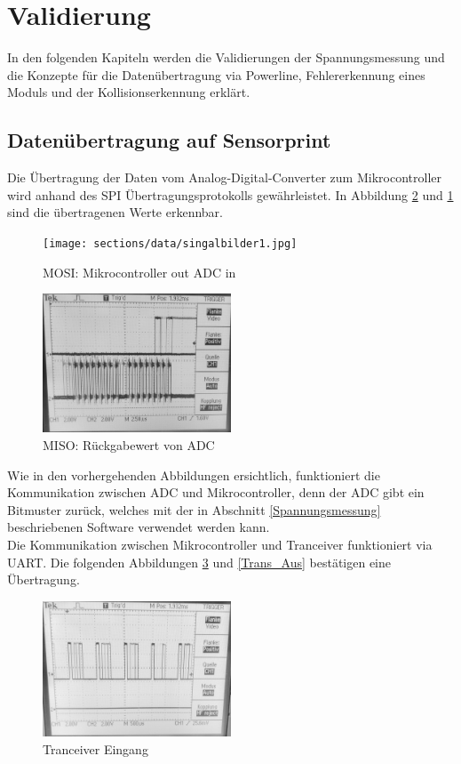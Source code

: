 \section{Validierung}
In den folgenden Kapiteln werden die Validierungen der Spannungsmessung und die Konzepte für die Datenübertragung via Powerline, Fehlererkennung eines Moduls und der Kollisionserkennung erklärt.
\subsection{Datenübertragung auf Sensorprint}
Die Übertragung der Daten vom Analog-Digital-Converter zum Mikrocontroller wird anhand des SPI Übertragungsprotokolls gewährleistet. In Abbildung \ref{SPI_MISO} und \ref{SPI_MOSI} sind die übertragenen Werte erkennbar. 
\begin{figure}[htb]
\centering
\texttt{[image: sections/data/singalbilder1.jpg]}
\caption{MOSI: Mikrocontroller out ADC in}
\label{SPI_MOSI}
\end{figure}

\begin{figure}[htb]
\centering
\includegraphics[width=0.5\textwidth]{sections/data/singalbilder3.jpg}
\caption{MISO: Rückgabewert von ADC}
\label{SPI_MISO}
\end{figure}

Wie in den vorhergehenden Abbildungen ersichtlich, funktioniert die Kommunikation zwischen ADC und Mikrocontroller, denn der ADC gibt ein Bitmuster zurück, welches mit der in Abschnitt \ref{Spannungsmessung} beschriebenen Software verwendet werden kann. \\
\newpage
Die Kommunikation zwischen Mikrocontroller und Tranceiver funktioniert via UART. Die folgenden Abbildungen \ref{Trans_Ein} und \ref{Trans_Aus} bestätigen eine Übertragung.
\begin{figure}[htb]
\centering
\includegraphics[width=0.5\textwidth]{sections/data/singalbilder8.jpg}
\caption{Tranceiver Eingang}
\label{Trans_Ein}
\end{figure}

